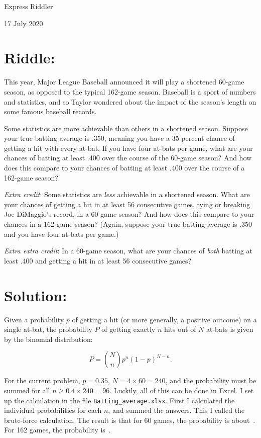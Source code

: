 \documentclass{article}
\begin{document}
\pagestyle{empty} %

\begin{center}
{\LARGE Express Riddler}

\vspace{0.15in}

{\Large 17 July 2020}
\end{center}


\section*{Riddle:}

This year, Major League Baseball announced it will play a shortened 60-game season, as opposed to the typical 162-game season.
Baseball is a sport of numbers and statistics, and so Taylor wondered about the impact of the season's length on some famous baseball records.

Some statistics are more achievable than others in a shortened season.
Suppose your true batting average is .350, meaning you have a 35 percent chance of getting a hit with every at-bat.
If you have four at-bats per game, what are your chances of batting at least .400 over the course of the 60-game season?
And how does this compare to your chances of batting at least .400 over the course of a 162-game season?

\textit{Extra credit}: Some statistics are \textit{less} achievable in a shortened season.
What are your chances of getting a hit in at least 56 consecutive games, tying or breaking Joe DiMaggio's record, in a 60-game season?
And how does this compare to your chances in a 162-game season?
(Again, suppose your true batting average is .350 and you have four at-bats per game.)

\textit{Extra extra credit}: In a 60-game season, what are your chances of \textit{both} batting at least .400 and getting a hit in at least 56 consecutive games?

\section*{Solution:}

Given a probability $p$ of getting a hit (or more generally, a positive outcome) on a single at-bat, the probability $P$ of getting exactly $n$ hits out of $N$ at-bats is given by the binomial distribution:

\[
P=\binom{N}{n}p^{n}(1-p)^{N-n}.
\]

For the current problem, $p=0.35$, $N=4\times60=240$, and the probability must be summed for all $n\geq0.4\times240=96$.
Luckily, all of this can be done in Excel.
I set up the calculation in the file \texttt{Batting\_average.xlsx}.
First I calculated the individual probabilities for each $n$, and summed the answers.
This I called the brute-force calculation.
The result is that for 60 games, the probability is about
\,.
For 162 games, the probability is
\,.
\end{document}
